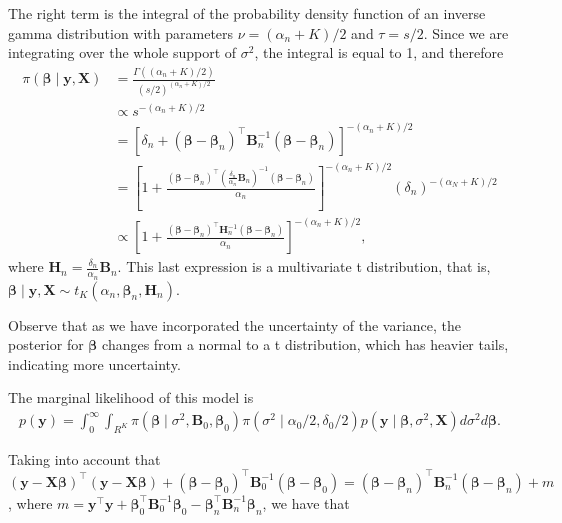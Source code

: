 The right term is the integral of the probability density function of an inverse gamma distribution with parameters $\nu = (\alpha_n+K)/2$ and $\tau = s/2$. Since we are integrating over the whole support of $\sigma^2$, the integral is equal to 1, and therefore
\begin{align*}
	\pi(\bm{\beta}\mid {\bm{y}},{\bm{X}}) & = \frac{\Gamma((\alpha_n+K)/2)}{(s/2)^{(\alpha_n+K)/2}} \\
	& \propto s^{-(\alpha_n+K)/2} \\
	& = [\delta_n + (\bm{\beta} - \bm{\beta}_n)^{\top}{{\bm{B}}}_n^{-1}(\bm{\beta} - \bm{\beta}_n)]^{-(\alpha_n+K)/2} \\
	& = \left[1 + \frac{(\bm{\beta} - \bm{\beta}_n)^{\top}\left(\frac{\delta_n}{\alpha_n}{{\bm{B}}}_n\right)^{-1}(\bm{\beta} - \bm{\beta}_n)}{\alpha_n}\right]^{-(\alpha_n+K)/2}(\delta_n)^{-(\alpha_N+K)/2} \\
	& \propto \left[1 + \frac{(\bm{\beta} - \bm{\beta}_n)^{\top}{\bm{H}}_n^{-1}(\bm{\beta} - \bm{\beta}_n)}{\alpha_n}\right]^{-(\alpha_n+K)/2},
\end{align*}
where ${\bm{H}}_n = \frac{\delta_n}{\alpha_n}{\bm{B}}_n$. This last expression is a multivariate t distribution, that is, $\bm{\beta}\mid {\bm{y}},{\bm{X}} \sim t_K(\alpha_n, \bm{\beta}_n, {\bm{H}}_n)$.

Observe that as we have incorporated the uncertainty of the variance, the posterior for $\bm{\beta}$ changes from a normal to a t distribution, which has heavier tails, indicating more uncertainty. 

The marginal likelihood of this model is
\begin{align*}
	p({\bm{y}})=\int_0^{\infty}\int_{R^K}\pi (\bm{\beta} \mid  \sigma^2,{\bm{B}}_0,\bm{\beta}_0 )\pi(\sigma^2\mid  \alpha_0/2, \delta_0/2)p({\bm{y}}\mid \bm{\beta}, \sigma^2, {\bm{X}})d\sigma^2 d\bm{\beta}.
\end{align*}

Taking into account that $({\bm{y}}-{\bm{X}}\bm{\beta})^{\top}({\bm{y}}-{\bm{X}}\bm{\beta})+(\bm{\beta}-\bm{\beta}_0)^{\top}{\bm{B}}_0^{-1}(\bm{\beta}-\bm{\beta}_0)=(\bm{\beta}-\bm{\beta}_n)^{\top}{\bm{B}}_n^{-1}(\bm{\beta}-\bm{\beta}_n)+m$, where $m={\bm{y}}^{\top}{\bm{y}}+\bm{\beta}_0^{\top}{\bm{B}}_0^{-1}\bm{\beta}_0-\bm{\beta}_n^{\top}{\bm{B}}_n^{-1}\bm{\beta}_n$, we have that

